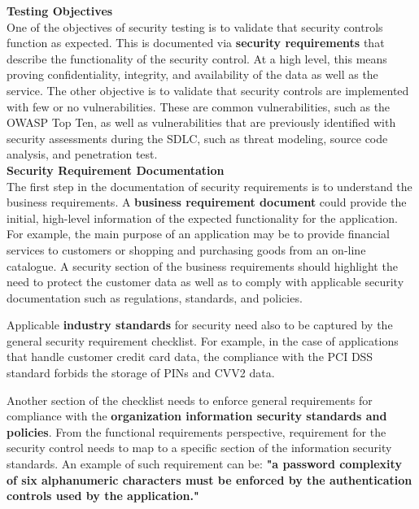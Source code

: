 		{\bf Testing Objectives} \\
		One of the objectives of security testing is to validate that security controls function as 
		expected. This is documented via {\bf security requirements} that describe the functionality 
		of the security control. At a high level, this means proving confidentiality, integrity, and 
		availability of the data as well as the service. The other objective is to validate that security
		controls are implemented with few or no vulnerabilities. These are common vulnerabilities, 
		such as the OWASP Top Ten, as well as vulnerabilities that are previously identified with 
		security assessments during the SDLC, such as threat modeling, source code analysis, and 
		penetration test. \\

		{\bf Security Requirement Documentation} \\
		The first step in the documentation of security requirements is to understand the 
		business requirements. A {\bf business requirement document} could provide the initial, 
		high-level information of the expected functionality for the application. For example, 
		the main purpose of an application may be to provide financial services to customers or 
		shopping and purchasing goods from an on-line catalogue. A security section of the business 
		requirements should highlight the need to protect the customer data as well as to comply 
		with applicable security documentation such as regulations, standards, and policies.

		Applicable {\bf industry standards} for security need also to be captured by the general security 
		requirement checklist. For example, in the case of applications that handle customer credit 
		card data, the compliance with the PCI DSS standard forbids the storage of PINs and CVV2 data.

		Another section of the checklist needs to enforce general requirements for compliance with the 
		{\bf organization information security standards and policies}. From the functional requirements 
		perspective, requirement for the security control needs to map to a specific section of the 
		information security standards. An example of such requirement can be: {\bf "a password
		complexity of six alphanumeric characters must be enforced by the authentication controls 
		used by the application."} \\

